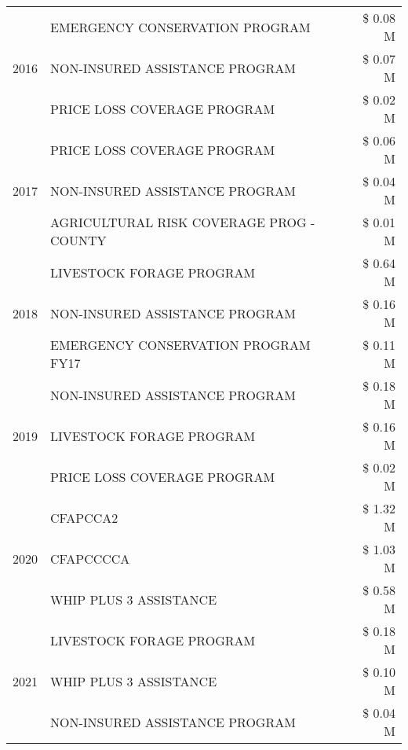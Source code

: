 \begin{tabular}{llr}
\multirow[t]{3}{*}{2016} & EMERGENCY CONSERVATION PROGRAM                & \$ 0.08 M \\
 & NON-INSURED ASSISTANCE PROGRAM                & \$ 0.07 M \\
 & PRICE LOSS COVERAGE PROGRAM                   & \$ 0.02 M \\
\cline{1-3}
\multirow[t]{3}{*}{2017} & PRICE LOSS COVERAGE PROGRAM & \$ 0.06 M \\
 & NON-INSURED ASSISTANCE PROGRAM & \$ 0.04 M \\
 & AGRICULTURAL RISK COVERAGE PROG - COUNTY & \$ 0.01 M \\
\cline{1-3}
\multirow[t]{3}{*}{2018} & LIVESTOCK FORAGE PROGRAM & \$ 0.64 M \\
 & NON-INSURED ASSISTANCE PROGRAM & \$ 0.16 M \\
 & EMERGENCY CONSERVATION PROGRAM FY17 & \$ 0.11 M \\
\cline{1-3}
\multirow[t]{3}{*}{2019} & NON-INSURED ASSISTANCE PROGRAM & \$ 0.18 M \\
 & LIVESTOCK FORAGE PROGRAM & \$ 0.16 M \\
 & PRICE LOSS COVERAGE PROGRAM & \$ 0.02 M \\
\cline{1-3}
\multirow[t]{3}{*}{2020} & CFAPCCA2 & \$ 1.32 M \\
 & CFAPCCCCA & \$ 1.03 M \\
 & WHIP PLUS 3 ASSISTANCE & \$ 0.58 M \\
\cline{1-3}
\multirow[t]{3}{*}{2021} & LIVESTOCK FORAGE PROGRAM & \$ 0.18 M \\
 & WHIP PLUS 3 ASSISTANCE & \$ 0.10 M \\
 & NON-INSURED ASSISTANCE PROGRAM & \$ 0.04 M \\
\cline{1-3}
\bottomrule
\end{tabular}
